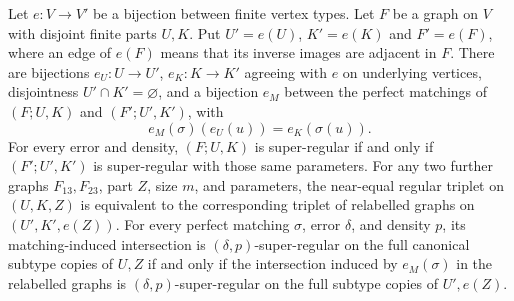 \begin{lemma}
Let $e:V\to V'$ be a bijection between finite vertex types.
Let $F$ be a graph on $V$ with disjoint finite parts $U,K$.
Put $U'=e(U)$, $K'=e(K)$ and $F'=e(F)$, where an edge of $e(F)$
means that its inverse images are adjacent in $F$.
There are bijections $e_U:U\to U'$, $e_K:K\to K'$ agreeing with $e$
on underlying vertices, disjointness $U'\cap K'=\varnothing$, and a
bijection $e_M$ between the perfect matchings of $(F;U,K)$ and
$(F';U',K')$, with
\[
 e_M(\sigma)(e_U(u))=e_K(\sigma(u)).
\]
For every error and density, $(F;U,K)$ is super-regular if and only
if $(F';U',K')$ is super-regular with those same parameters.
For any two further graphs $F_{13},F_{23}$, part $Z$, size $m$, and
parameters, the near-equal regular triplet on $(U,K,Z)$ is equivalent
to the corresponding triplet of relabelled graphs on $(U',K',e(Z))$.
For every perfect matching $\sigma$, error $\delta$, and density $p$,
its matching-induced intersection is $(\delta,p)$-super-regular on
the full canonical subtype copies of $U,Z$ if and only if the
intersection induced by $e_M(\sigma)$ in the relabelled graphs is
$(\delta,p)$-super-regular on the full subtype copies of $U',e(Z)$.
\end{lemma}
